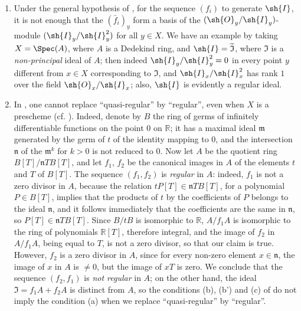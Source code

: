 \begin{remarks}[16.9.6]
\label{IV.16.9.6}
\begin{enumerate}
  \item[\rm{(i)}] Under the general hypothesis of , for the sequence $(f_i)$ to generate $\sh{I}$, it is not enough that the $(\bar f_i)_y$ form a basis of the $(\sh{O}_y/\sh{I}_y)$-module $(\sh{I}_y/\sh{I}_y^2)$ for all $y \in X$.
  We have an example by 
  taking  $X = \Spec(A)$, where $A$ is a Dedekind ring, and $\sh{I} = \widetilde{\mathfrak{I}}$, where $\mathfrak{I}$ is a \emph{non-principal} ideal of $A$;
  then indeed $\sh{I}_y/\sh{I}_y^2 = 0$ in every point $y$ different from $x \in X$ corresponding to $\mathfrak{I}$, and $\sh{I}_x/\sh{I}_x^2$ has rank $1$ over the field $\sh{O}_x/\sh{I}_x$;
  also, $\sh{I}$ is evidently a regular ideal.

  \item[\rm{(ii)}] In , one cannot replace ``quasi-regular'' by ``regular'', even when $X$ is a prescheme (cf. ).
  Indeed, denote by $B$ the ring of germs of infinitely differentiable functions on the point $0$ on $\mathbb{R}$; 
  it has a maximal ideal $\mathfrak{m}$ generated by the germ of $t$ of the identity mapping to $0$, and the intersection $\mathfrak{n}$ of the $\mathfrak{m}^k$ for $k>0$ is not reduced to $0$.
  Now let $A$ be the quotient ring $B[T]/\mathfrak{n}TB[T]$, and let $f_1$, $f_2$ be the canonical images in $A$ of the elements $t$ and $T$ of $B[T]$.
  The sequence $(f_1, f_2)$ is \emph{regular} in $A$: indeed, $f_1$ is not a zero divisor in $A$, because the relation $tP[T] \in \mathfrak{n}TB[T]$, for a polynomial $P \in B[T]$, implies that the products of $t$ by the coefficients of $P$ belongs to the ideal $\mathfrak{n}$, and it follows immediately that the coefficients are the same in $\mathfrak{n}$, so $P[T] \in \mathfrak{n}TB[T]$.
  Since $B/tB$ is isomorphic to $\mathbb{R}$, $A/f_1A$ is isomorphic to the ring of polynomials $\mathbb{R}[T]$, therefore integral, and the image of $f_2$ in $A/f_1A$, being equal to $T$, is not a zero divisor, so that our claim is true.
  However, $f_2$ is a zero divisor in $A$, since for every non-zero element $x \in \mathfrak{n}$, the image of $x$ in $A$ is $\neq 0$, but the image of $xT$ is zero.
  We conclude that the sequence $(f_2, f_1)$ is \emph{not regular} in $A$;
  on the other hand, the ideal $\mathfrak{I} = f_1A + f_2A$ is distinct from $A$, so the conditions (b), (b') and (c) of  do not imply the condition (a) when we replace ``quasi-regular'' by ``regular''.
\end{enumerate}
\end{remarks}

